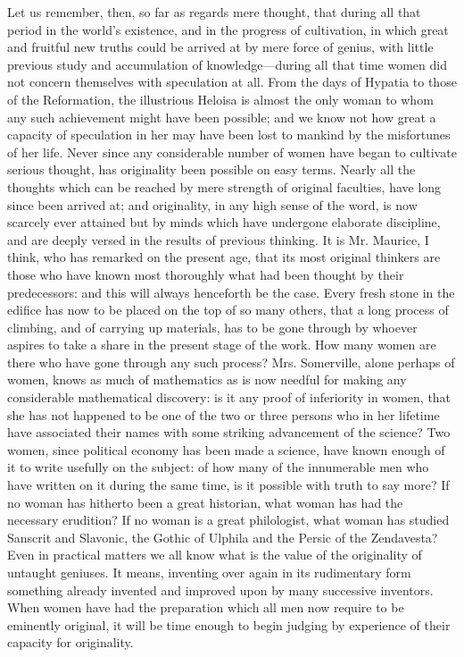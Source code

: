 \documentclass[12pt]{report}
\begin{document}
Let us remember, then, so far as regards mere thought, that during all that period in the world's existence, and in the progress of cultivation, in which great and fruitful new truths could be arrived at by mere force of genius, with little previous study and accumulation of knowledge—during all that time women did not concern themselves with speculation at all. From the days of Hypatia to those of the Reformation, the illustrious Heloisa is almost the only woman to whom any such achievement might have been possible; and we know not how great a capacity of speculation in her may have been lost to mankind by the misfortunes of her life. Never since any considerable number of women have began to cultivate serious thought, has originality been possible on easy terms. Nearly all the thoughts which can be reached by mere strength of original faculties, have long since been arrived at; and originality, in any high sense of the word, is now scarcely ever attained but by minds which have undergone elaborate discipline, and are deeply versed in the results of previous thinking. It is Mr. Maurice, I think, who has remarked on the present age, that its most original thinkers are those who have known most thoroughly what had been thought by their predecessors: and this will always henceforth be the case. Every fresh stone in the edifice has now to be placed on the top of so many others, that a long process of climbing, and of carrying up materials, has to be gone through by whoever aspires to take a share in the present stage of the work. How many women are there who have gone through any such process? Mrs. Somerville, alone perhaps of women, knows as much of mathematics as is now needful for making any considerable mathematical discovery: is it any proof of inferiority in women, that she has not happened to be one of the two or three persons who in her lifetime have associated their names with some striking advancement of the science? Two women, since political economy has been made a science, have known enough of it to write usefully on the subject: of how many of the innumerable men who have written on it during the same time, is it possible with truth to say more? If no woman has hitherto been a great historian, what woman has had the necessary erudition? If no woman is a great philologist, what woman has studied Sanscrit and Slavonic, the Gothic of Ulphila and the Persic of the Zendavesta? Even in practical matters we all know what is the value of the originality of untaught geniuses. It means, inventing over again in its rudimentary form something already invented and improved upon by many successive inventors. When women have had the preparation which all men now require to be eminently original, it will be time enough to begin judging by experience of their capacity for originality.
\end{document}
